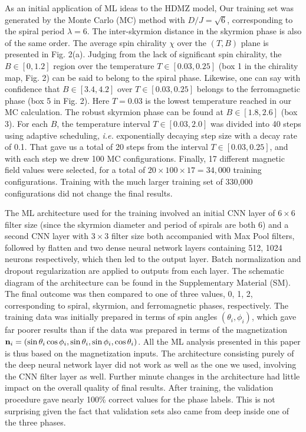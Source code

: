 \documentclass[reprint,amsmath,amssymb,aps,showpacs,onecolumn,superscriptaddress,prb]{revtex4-1}
\renewcommand{\v}[1]{{\bf #1}}
\begin{document}
\begin{widetext}
As an initial application of ML ideas to the HDMZ model, Our training set was generated by the Monte Carlo (MC) method with $D/J=\sqrt{6}$, corresponding to the spiral period $\lambda=6$. The inter-skyrmion distance in the skyrmion phase is also of the same order. The average spin chirality $\chi$ over the $(T,B)$ plane is presented in Fig. 2(a). Judging from the lack of significant spin chirality, the $B\in [0, 1.2]$ region over the temperature $T\in [0.03, 0.25]$ (box 1 in the chirality map, Fig. 2) can be said to belong to the spiral phase. Likewise, one can say with confidence that $B\in [3.4, 4.2]$ over $T\in [0.03, 0.25]$ belongs to the ferromagnetic phase (box 5 in Fig. 2). Here $T=0.03$ is the lowest temperature reached in our MC calculation. The robust skyrmion phase can be found at $B\in[1.8, 2.6]$ (box 3). For each $B$, the temperature interval $T \in [0.03, 2.0]$ was divided into 40 steps using adaptive scheduling, {\it i.e.} exponentially decaying step size with a decay rate of 0.1. That gave us a total of 20 steps from the interval $T \in [0.03, 0.25]$, and with each step we drew 100 MC configurations. Finally, 17 different magnetic field values were selected, for a total of $20 \times 100\times 17 = 34,000$ training configurations. Training with the much larger training set of 330,000 configurations did not change the final results.

The  ML  architecture used  for  the  training  involved an  initial CNN  layer  of  $6\times 6$  filter  size  (since  the skyrmion  diameter  and  period  of  spirals  are  both  6)  and a second CNN layer with $3\times3$ filter size both accompanied  with  Max  Pool  filters,  followed  by  flatten and two  dense neural  network  layers  containing  512,  1024  neurons  respectively, which then led to the output layer. Batch normalization and dropout regularization are applied to outputs from each layer. The schematic diagram of the architecture can be found in the Supplementary Material (SM). The final outcome was then compared to one of three values, 0, 1, 2, corresponding to spiral, skyrmion, and ferromagnetic phases, respectively. The training data was initially prepared in terms of spin angles $(\theta_i , \phi_i )$, which gave far poorer results than if the data was prepared in terms of the magnetization $\v n_i = (\sin \theta_i \cos \phi_i, \sin \theta_i, \sin \phi_i, \cos\theta_i)$. All the ML analysis presented in this paper is thus based on the magnetization inputs. The architecture consisting purely of the deep neural network layer did not work as well as the one we used, involving the CNN filter layer as well. Further minute changes in the architecture had little impact on the overall quality of final results. After training, the validation procedure gave nearly 100\% correct values for the phase labels. This is not surprising given the fact that validation sets also came from deep inside one of the three phases.


\end{widetext}
\end{document}
